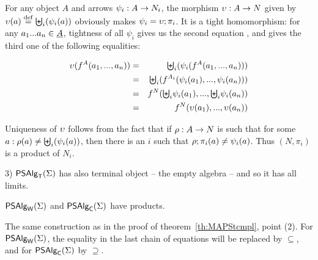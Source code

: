 \documentclass[10pt]{article}
\begin{document}
\begin{Proof}
For any object $A$ and arrows $\psi_i:A\rightarrow N_i$, the morphism
$\upsilon:A\rightarrow N$ given by $\upsilon(a) \stackrel{{\rm \tiny{def}}}= \biguplus_i(\psi_i(a))$ %
obviously makes $\psi_i=\upsilon;\pi_i$.  It is a tight
homomorphism: for any $a_1...a_n\in\underline {A}$, tightness of all
$\psi_i$ gives us the second equation , and 
gives the third one  of the following equalities:

\begin{eqnarray}
\uni(f^A(a_1,...,a_n)) 
& = &  
{\textstyle{\bigdcup_i}}(\psi_i(f^{A}(a_1,...,a_n))) \nonumber 
\\ \label{eq:bul} 
& = &  
{\textstyle{\bigdcup_i}} (f^{A_i}(\psi_i(a_1),...,\psi_i(a_n))) 
\\ \label{eq:star}
& = &  
f^N({\textstyle{\bigdcup_i}}\psi_i(a_1),
  ...,{\textstyle{\bigdcup_i}}\psi_i(a_n)) \\ %
& = & 
f^N(\uni(a_1),...,\uni(a_n)) \nonumber
\end{eqnarray}


Uniqueness of $\upsilon$ follows from the fact that if $\rho:A\rightarrow N$ is
such that for some $a: \rho(a)\not=\biguplus_i(\psi_i(a))$, then there
is an $i$ such that $\rho;\pi_i(a)\not =\psi_i(a)$. Thus
$(N,\pi_i)$ is a product of $N_i$.

3) $\mbox{\sf PSAlg}_{\sf T}(\Sigma)$ has also terminal object -- the empty algebra -- and so it
has all limits.
\end{Proof}

\begin{Fact}
$\mbox{\sf PSAlg}_{\sf W}(\Sigma)$ and $\mbox{\sf PSAlg}_{\sf C}(\Sigma)$ have products.
\end{Fact}

\begin{Proof}
The same construction as in the proof of theorem~\ref{th:MAPStcmpl},
point (2).  For $\mbox{\sf PSAlg}_{\sf W}(\Sigma)$, the equality  in the last chain
of equations will be replaced by $\subseteq$, and for $\mbox{\sf PSAlg}_{\sf C}(\Sigma)$ by
$\supseteq$.
\end{Proof}
\end{document}
